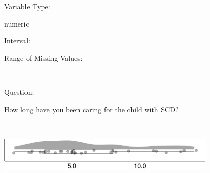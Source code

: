 \documentclass[
]{article}
\begin{document}
\begin{minipage}[t]{0.3\linewidth}

Variable Type:

\end{minipage}%
\begin{minipage}[t]{0.7\linewidth}

numeric

\end{minipage}

\begin{minipage}[t]{0.3\linewidth}

Interval:

\end{minipage}%
\begin{minipage}[t]{0.7\linewidth}

\end{minipage}

\begin{minipage}[t]{0.3\linewidth}

Range of Missing Values:

\end{minipage}%
\begin{minipage}[t]{0.7\linewidth}

~

\end{minipage}

\begin{minipage}[t]{0.3\linewidth}

Question:

\end{minipage}%
\begin{minipage}[t]{0.7\linewidth}

How long have you been caring for the child with SCD?

\end{minipage}

\begin{minipage}[t]{0.3\linewidth}

~

\end{minipage}%
\begin{minipage}[t]{0.7\linewidth}

\includegraphics[width=396px]{codebook_template_files/figure-latex/q12_rainplot-1}

\end{minipage}
 \vspace*{0.5mm} 
\end{document}
